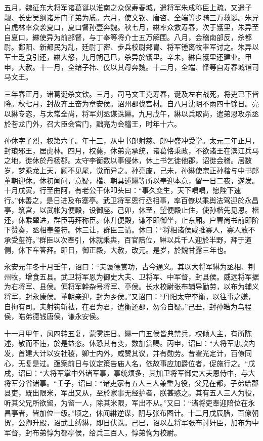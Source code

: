\documentclass[12pt,UTF8]{ctexbook}
\begin{document}
五月，魏征东大将军诸葛诞以淮南之众保寿春城，遣将军朱成称臣上疏，又遣子靓、长史吴纲诸牙门子弟为质。六月，使文钦、唐咨、全端等步骑三万救诞。朱异自虎林率众袭夏口，夏口督孙壹奔魏。秋七月，綝率众救寿春，次于镬里，朱异至自夏口，綝使异为前部督，与丁奉等将介士五万解围。八月，会稽南部反，杀都尉。鄱阳、新都民为乱，廷尉丁密、步兵校尉郑胄、将军锺离牧率军讨之。朱异以军士乏食引还，綝大怒，九月朔己巳，杀异於镬里。辛未，綝自镬里还建业。甲申，大赦。十一月，全绪子祎、仪以其母奔魏。十二月，全端、怿等自寿春城诣司马文王。

三年春正月，诸葛诞杀文钦。三月，司马文王克寿春，诞及左右战死，将吏已下皆降。秋七月，封故齐王奋为章安侯。诏州郡伐宫材。自八月沈阴不雨四十馀日。亮以綝专恣，与太常全尚，将军刘丞谋诛綝。九月戊午，綝以兵取尚，遣弟恩攻杀丞於苍龙门外，召大臣会宫门，黜亮为会稽王，时年十六。

孙休字子烈，权第六子。年十三，从中书郎射慈、郎中盛冲受学。太元二年正月，封琅邪王，居虎林。四月，权薨，休弟亮承统，诸葛恪秉政，不欲诸王在滨江兵马之地，徙休於丹杨郡。太守李衡数以事侵休，休上书乞徙他郡，诏徙会稽。居数岁，梦乘龙上天，顾不见尾，觉而异之。孙亮废，己未，孙綝使宗正孙楷与中书郎董朝迎休。休初闻问，意疑，楷、朝具述綝等所以奉迎本意，留一日二夜，遂发。十月戊寅，行至曲阿，有老公干休叩头曰：“事久变生，天下喁喁，愿陛下速行。”休善之，是日进及布塞亭。武卫将军恩行丞相事，率百僚以乘舆法驾迎於永昌亭，筑宫，以武帐为便殿，设御座。己卯，休至，望便殿止住，使孙楷先见恩。楷还，休乘辇进，群臣再拜称臣。休升便殿，谦不即御坐，止东厢。户曹尚书前即阶下赞奏，丞相奉玺符。休三让，群臣三请。休曰：“将相诸侯咸推寡人，寡人敢不承受玺符。”群臣以次奉引，休就乘舆，百官陪位，綝以兵千人迎於半野，拜于道侧，休下车答拜。即日，御正殿，大赦，改元。是岁，於魏甘露三年也。

永安元年冬十月壬午，诏曰：“夫褒德赏功，古今通义。其以大将军綝为丞相、荆州牧，增食五县。武卫将军恩为御史大夫、卫将军、中军督，封县侯。威远将军据为右将军、县侯。偏将军幹杂号将军、亭侯。长水校尉张布辅导勤劳，以布为辅义将军，封永康侯。董朝亲迎，封为乡侯。”又诏曰：“丹阳太守李衡，以往事之嫌，自拘有司。夫射钩斩袪，在君为君，遣衡还郡，勿令自疑。”己丑，封孙皓为乌程侯，皓弟德钱唐侯，谦永安侯。

十一月甲午，风四转五复，蒙雾连日。綝一门五侯皆典禁兵，权倾人主，有所陈述，敬而不违，於是益恣。休恐其有变，数加赏赐。丙申，诏曰：“大将军忠款内发，首建大计以安社稷，卿士内外，咸赞其议，并有勋劳。昔霍光定计，百僚同心，无复是过。亟案前日与议定策告庙人名，依故事应加爵位者，促施行之。“戊戌，诏曰：“大将军掌中外诸军事，事统烦多，其加卫将军御史大夫恩侍中，与大将军分省诸事。“壬子，诏曰：“诸吏家有五人三人兼重为役，父兄在都，子弟给郡县吏，既出限米，军出又从，至於家事无经护者，朕甚愍之。其有五人三人为役，听其父兄所欲留，为留一人，除其米限，军出不从。”又曰：“诸将吏奉迎陪位在永昌亭者，皆加位一级。”顷之，休闻綝逆谋，阴与张布图计。十二月戊辰腊，百僚朝贺，公卿升殿，诏武士缚綝，即日伏诛。己巳，诏以左将军张布讨奸臣，加布为中军督，封布弟惇为都亭侯，给兵三百人，惇弟恂为校尉。
\end{document}
